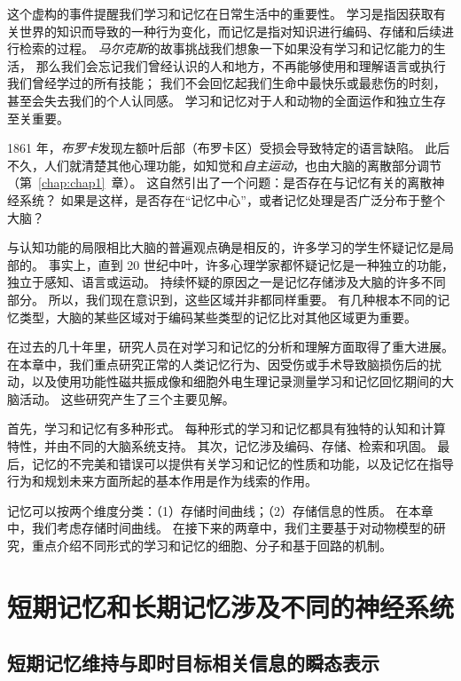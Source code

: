 这个虚构的事件提醒我们学习和记忆在日常生活中的重要性。
学习是指因获取有关世界的知识而导致的一种行为变化，而记忆是指对知识进行编码、存储和后续进行检索的过程。
\textit{马尔克斯}的故事挑战我们想象一下如果没有学习和记忆能力的生活，
那么我们会忘记我们曾经认识的人和地方，不再能够使用和理解语言或执行我们曾经学过的所有技能；
我们不会回忆起我们生命中最快乐或最悲伤的时刻，甚至会失去我们的个人认同感。
学习和记忆对于人和动物的全面运作和独立生存至关重要。


1861 年，\textit{布罗卡}发现左额叶后部（布罗卡区）受损会导致特定的语言缺陷。
此后不久，人们就清楚其他心理功能，如知觉和\textit{自主运动}，也由大脑的离散部分调节（第~\ref{chap:chap1}~章）。
这自然引出了一个问题：是否存在与记忆有关的离散神经系统？
如果是这样，是否存在“记忆中心”，或者记忆处理是否广泛分布于整个大脑？


与认知功能的局限相比大脑的普遍观点确是相反的，许多学习的学生怀疑记忆是局部的。
事实上，直到 20 世纪中叶，许多心理学家都怀疑记忆是一种独立的功能，独立于感知、语言或运动。
持续怀疑的原因之一是记忆存储涉及大脑的许多不同部分。
所以，我们现在意识到，这些区域并非都同样重要。
有几种根本不同的记忆类型，大脑的某些区域对于编码某些类型的记忆比对其他区域更为重要。


在过去的几十年里，研究人员在对学习和记忆的分析和理解方面取得了重大进展。
在本章中，我们重点研究正常的人类记忆行为、因受伤或手术导致脑损伤后的扰动，以及使用功能性磁共振成像和细胞外电生理记录测量学习和记忆回忆期间的大脑活动。
这些研究产生了三个主要见解。


首先，学习和记忆有多种形式。
每种形式的学习和记忆都具有独特的认知和计算特性，并由不同的大脑系统支持。
其次，记忆涉及编码、存储、检索和巩固。
最后，记忆的不完美和错误可以提供有关学习和记忆的性质和功能，以及记忆在指导行为和规划未来方面所起的基本作用是作为线索的作用。


记忆可以按两个维度分类：（1）存储时间曲线；（2）存储信息的性质。
在本章中，我们考虑存储时间曲线。
在接下来的两章中，我们主要基于对动物模型的研究，重点介绍不同形式的学习和记忆的细胞、分子和基于回路的机制。



\section{短期记忆和长期记忆涉及不同的神经系统}

\subsection{短期记忆维持与即时目标相关信息的瞬态表示}

